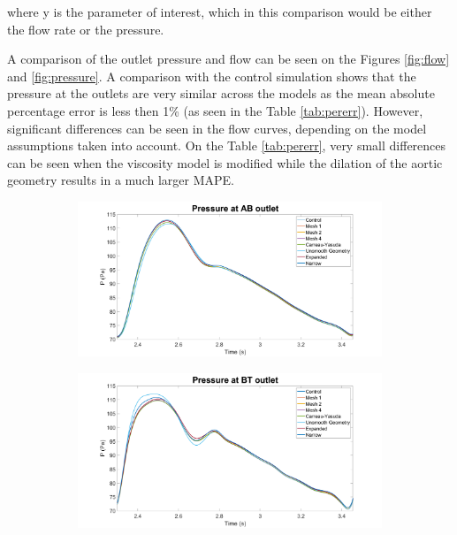 where y is the parameter of interest, which in this comparison would be either the flow rate or the pressure. \par
A comparison of the outlet pressure and flow can be seen on the Figures \ref{fig:flow} and \ref{fig:pressure}. A comparison with the control simulation shows that the pressure at the outlets are very similar across the models as the mean absolute percentage error is less then 1\% (as seen in the Table \ref{tab:pererr}). However, significant differences can be seen in the flow curves, depending on the model assumptions taken into account. On the Table \ref{tab:pererr}, very small differences can be seen when the viscosity model is modified while the dilation of the aortic geometry results in a much larger MAPE.
\begin{figure}
     \centering
     \begin{subfigure}[b]{0.49\textwidth}
         \centering
         \includegraphics[width=\textwidth]{Figures/PAB.png}
     \end{subfigure}
     \hfill
     \begin{subfigure}[b]{0.49\textwidth}
         \centering
         \includegraphics[width=\textwidth]{Figures/PBT.png}
     \end{subfigure}

\end{figure}
